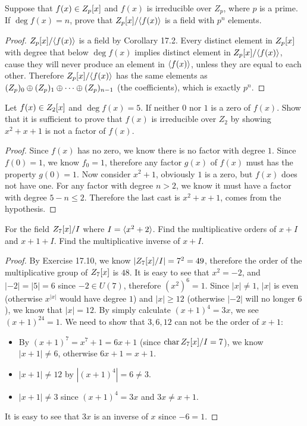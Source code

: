 \documentclass[../main.tex]{subfiles}
\begin{document}
\setcounter{exercise}{9}
\begin{exercise}
  Suppose that $f(x) \in Z_p[x]$ and $f(x)$ is irreducible
  over $Z_p$, where $p$ is a prime. If $\deg f(x) = n$, 
  prove that $Z_p[x]/\langle f(x) \rangle$ is a field with $p^n$ elements.
\end{exercise}
\begin{proof}
  $Z_p[x]/\langle f(x) \rangle$ is a field by Corollary 17.2. Every distinct element in $Z_p[x]$
  with degree that below $\deg f(x)$ implies distinct element in $Z_p[x]/\langle f(x) \rangle$,
  cause they will never produce an element in $\langle f(x) \rangle$, unless they are equal to each other.
  Therefore $Z_p[x]/\langle f(x) \rangle$ has the same elements as $(Z_p)_0 \oplus (Z_p)_1 \oplus \cdots \oplus (Z_p)_{n - 1}$ 
  (the coefficients),
  which is exactly $p^n$.
\end{proof}

\setcounter{exercise}{17}
\begin{exercise}
  Let $f(x) \in Z_2[x]$ and $\deg f(x) = 5$. If neither $0$ nor $1$
  is a zero of $f(x)$. Show that it is sufficient to prove that $f(x)$
  is irreducible over $Z_2$ by showing $x^2 + x + 1$ is not a factor of $f(x)$.
\end{exercise}
\begin{proof}
  Since $f(x)$ has no zero, we know there is no factor with degree $1$.
  Since $f(0) = 1$, we know $f_0 = 1$, therefore any factor $g(x)$ of $f(x)$
  must has the property $g(0) = 1$.
  Now consider $x^2 + 1$, obviously $1$ is a zero, but $f(x)$ does not have one.
  For any factor with degree $n > 2$, we know it must have a factor with degree $5 - n \leq 2$.
  Therefore the last cast is $x^2 + x + 1$, comes from the hypothesis.
\end{proof}

\begin{exercise}
  For the field $Z_7[x]/I$ where $I = \langle x^2 + 2 \rangle$. Find the multiplicative
  orders of $x + I$ and $x + 1 + I$. Find the multiplicative inverse of $x + I$.
\end{exercise}
\begin{proof}
  By Exercise 17.10, we know $|Z_7[x]/I| = 7^2 = 49$, therefore the order of the multiplicative
  group of $Z_7[x]$ is $48$.
  It is easy to see that $x^2 = -2$, and $|-2| = |5| = 6$ since $-2 \in U(7)$,
  therefore $(x^2)^6 = 1$.
  Since $|x| \neq 1$, $|x|$ is even (otherwise $x^{|x|}$ would have degree $1$) and $|x| \ge 12$ (otherwise $|-2|$ will no longer $6$),
  we know that $|x| = 12$.
  By simply calculate $(x + 1)^4 = 3x$, we see $(x + 1)^{24} = 1$.
  We need to show that $3, 6, 12$ can not be the order of $x + 1$:
  \begin{itemize}
    \item By $(x + 1)^7 = x^7 + 1 = 6x + 1$ (since $\operatorname{char} Z_7[x]/I = 7$),
          we know $|x + 1| \neq 6$, otherwise $6x + 1 = x + 1$.
    \item $|x + 1| \neq 12$ by $|(x + 1)^4| = 6 \neq 3$.
    \item $|x + 1| \neq 3$ since $(x + 1)^4 = 3x$ and $3x \neq x + 1$.
  \end{itemize}

  It is easy to see that $3x$ is an inverse of $x$ since $-6 = 1$.
\end{proof}
\end{document}

